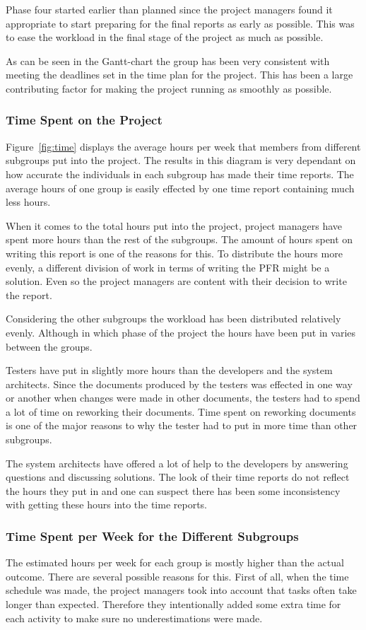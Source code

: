 \documentclass[a4paper]{article}
\begin{document}
Phase four started earlier than planned since the project managers found it appropriate to start preparing for the final reports as early as possible. This was to ease the workload in the final stage of the project as much as possible.

As can be seen in the Gantt-chart the group has been very consistent with meeting the deadlines set in the time plan for the project. This has been a large contributing factor for making the project running as smoothly as possible.

\subsubsection{Time Spent on the Project}
Figure~\ref{fig:time} displays the average hours per week that members from different subgroups put into the project. The results in this diagram is very dependant on how accurate the individuals in each subgroup has made their time reports. The average hours of one group is easily effected by one time report containing much less hours. 

When it comes to the total hours put into the project, project managers have spent more hours than the rest of the subgroups. The amount of hours spent on writing this report is one of the reasons for this. To distribute the hours more evenly, a different division of work in terms of writing the PFR might be a solution. Even so the project managers are content with their decision to write the report. 

Considering the other subgroups the workload has been distributed relatively evenly. Although in which phase of the project the hours have been put in varies between the groups. 

Testers have put in slightly more hours than the developers and the system architects. Since the documents produced by the testers was effected in one way or another when changes were made in other documents, the testers had to spend a lot of time on reworking their documents. Time spent on reworking documents is one of the major reasons to why the tester had to put in more time than other subgroups. 

The system architects have offered a lot of help to the developers by answering questions and discussing solutions. The look of their time reports do not reflect the hours they put in and one can suspect there has been some inconsistency with getting these hours into the time reports.


\subsubsection{Time Spent per Week for the Different Subgroups}
The estimated hours per week for each group is mostly higher than the actual outcome. There are several possible reasons for this. First of all, when the time schedule was made, the project managers took into account that tasks often take longer than expected. Therefore they intentionally added some extra time for each activity to make sure no underestimations were made. 
\end{document}

